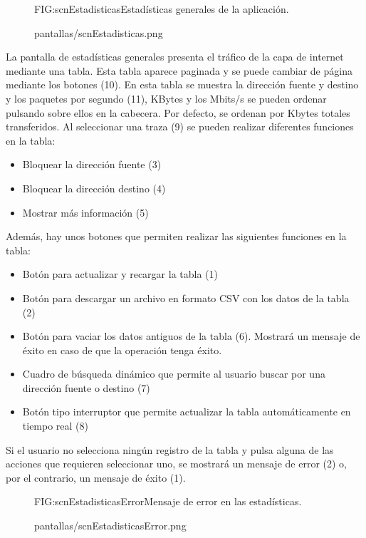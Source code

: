 \begin{figure}[Estadísticas generales]{FIG:scnEstadisticas}{Estadísticas generales de la aplicación.}
  \begin{image}{}{}{pantallas/scnEstadisticas.png}
  \end{image}
\end{figure}

La pantalla de estadísticas generales presenta el tráfico de la capa de internet mediante una tabla. Esta tabla aparece paginada y se puede cambiar de página mediante los botones (10). En esta tabla se muestra la dirección fuente y destino y los paquetes por segundo (11), KBytes y los Mbits/s se pueden ordenar pulsando sobre ellos en la cabecera. Por defecto, se ordenan por Kbytes totales transferidos. Al seleccionar una traza (9) se pueden realizar diferentes funciones en la tabla:
\begin{itemize}
\item Bloquear la dirección fuente (3)
\item Bloquear la dirección destino (4)
\item Mostrar más información (5)
\end{itemize}
Además, hay unos botones que permiten realizar las siguientes funciones en la tabla:
\begin{itemize}
\item Botón para actualizar y recargar la tabla (1)
\item Botón para descargar un archivo en formato CSV con los datos de la tabla (2)
\item Botón para vaciar los datos antiguos de la tabla (6). Mostrará un mensaje de éxito en caso de que la operación tenga éxito.
\item Cuadro de búsqueda dinámico que permite al usuario buscar por una dirección fuente o destino (7)
\item Botón tipo interruptor que permite actualizar la tabla automáticamente en tiempo real (8)
\end{itemize}

Si el usuario no selecciona ningún registro de la tabla y pulsa alguna de las acciones que requieren seleccionar uno, se mostrará un mensaje de error (2) o, por el contrario, un mensaje de éxito (1).
\begin{figure}[Mensaje de error en las estadísticas.]{FIG:scnEstadisticasError}{Mensaje de error en las estadísticas.}
  \begin{image}{}{}{pantallas/scnEstadisticasError.png}
  \end{image}
\end{figure}

